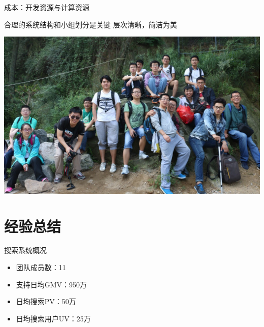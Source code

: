 \documentclass{beamer}
\begin{document}
\begin{CJK}{UTF8}{gbsn}
\begin{frame}{成本：开发资源与计算资源}
  \begin{center}
    \plotNumEngineerChart[scale=0.7]
  \end{center}
\end{frame}

\begin{frame}{合理的系统结构和小组划分是关键}
  层次清晰，简洁为美
  \begin{center}
    \includegraphics[scale=0.17]{./images/team}
  \end{center}
\end{frame}

\section{经验总结}

\begin{frame}{搜索系统概况}
  \begin{itemize}
  \item { 团队成员数：11 }
  \item { 支持日均GMV：950万 }
  \item { 日均搜索PV：50万 }
  \item { 日均搜索用户UV：25万 }
  \end{itemize}
\end{frame}


\end{CJK}
\end{document}
